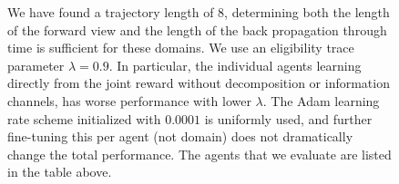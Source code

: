 \documentclass{article}
\begin{document}
\begin{figure}

We have found a trajectory length of $8$, determining both the length of the forward view and the length of the back propagation through time is sufficient for these domains. We use an eligibility trace parameter $\lambda=0.9$. In particular, the individual agents learning directly from the joint reward without decomposition or information channels, has worse performance with lower $\lambda$. The Adam \citep{Kingma14} learning rate scheme initialized with $0.0001$ is uniformly used, and further fine-tuning this per agent (not domain) does not dramatically change the total performance. The agents that we evaluate are listed in the table above.%
%

 
 



\end{figure}
\end{document}
